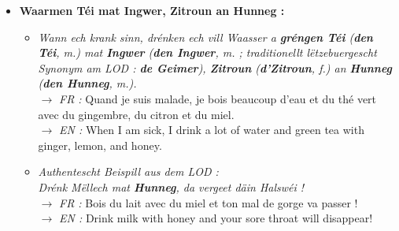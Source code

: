 \begin{itemize}
    \item \textbf{Waarmen Téi mat Ingwer, Zitroun an Hunneg :}
    \begin{itemize}
        \item \textit{Wann ech krank sinn, drénken ech vill Waasser a \textbf{gréngen Téi} (\textbf{den Téi}, m.) mat \textbf{Ingwer} (\textbf{den Ingwer}, m. ; traditionellt lëtzebuergescht Synonym am LOD : \textbf{de Geimer}), \textbf{Zitroun} (\textbf{d'Zitroun}, f.) an \textbf{Hunneg} (\textbf{den Hunneg}, m.).} \\
        $\rightarrow$ \textit{FR :} Quand je suis malade, je bois beaucoup d'eau et du thé vert avec du gingembre, du citron et du miel. \\
        $\rightarrow$ \textit{EN :} When I am sick, I drink a lot of water and green tea with ginger, lemon, and honey.
        \item \textit{Authentescht Beispill aus dem LOD :} \\
        \textit{Drénk Mëllech mat \textbf{Hunneg}, da vergeet däin Halswéi !} \\
        $\rightarrow$ \textit{FR :} Bois du lait avec du miel et ton mal de gorge va passer ! \\
        $\rightarrow$ \textit{EN :} Drink milk with honey and your sore throat will disappear!
    \end{itemize}

    \vspace{0.3em}

    \begin{center}
    \end{center}


\end{itemize}
